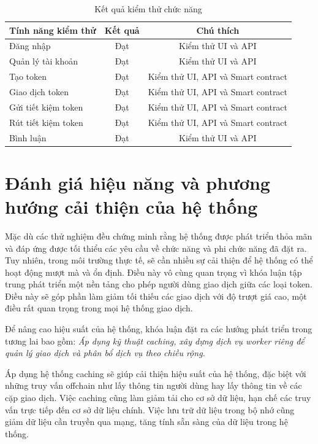 \begin{table}[htbp]
  \centering
  \begin{tabular}{|p{5cm}|c|c|}
    \hline
    \textbf{Tính năng kiểm thử} & \textbf{Kết quả} & \textbf{Chú thích}                 \\
    \hline
    Đăng nhập                   & Đạt              & Kiểm thử UI và API                 \\
    \hline
    Quản lý tài khoản           & Đạt              & Kiểm thử UI và API                 \\
    \hline
    Tạo token                   & Đạt              & Kiểm thử UI, API và Smart contract \\
    \hline
    Giao dịch token             & Đạt              & Kiểm thử UI, API và Smart contract \\
    \hline
    Gửi tiết kiệm token         & Đạt              & Kiểm thử UI, API và Smart contract \\
    \hline
    Rút tiết kiệm token         & Đạt              & Kiểm thử UI, API và Smart contract \\
    \hline
    Bình luận                   & Đạt              & Kiểm thử UI và API                 \\
    \hline
  \end{tabular}
  \caption{Kết quả kiểm thử chức năng}
  \label{tab:test-results}
\end{table}

\section{Đánh giá hiệu năng và phương hướng cải thiện của hệ thống}
Mặc dù các thử nghiệm đều chứng minh rằng hệ thống được phát triển thỏa mãn
và đáp ứng được tối thiểu các yêu cầu về chức năng và phi chức năng đã đặt ra.
Tuy nhiên, trong môi trường thực tế, sẽ cần nhiều sự cải thiện để hệ thống có
thể
hoạt động mượt mà và ổn định. Điều này vô cùng quan trọng vì khóa luận tập
trung phát triển một nền tảng cho phép người dùng giao dịch giữa các loại
token. Điều này sẽ góp phần làm giảm tối thiếu các giao dịch với độ trượt giá
cao, một điều rất quan trọng trong mọi hệ thống giao dịch.

Để nâng cao hiệu suất của hệ thống, khóa luận đặt ra các hướng
phát triển trong tương lai bao gồm: \textit{Áp dụng kỹ thuật caching, xây dựng
  dịch vụ worker riêng để quản lý giao dịch và phân bổ dịch vụ theo chiều rộng.}

Áp dụng hệ thống caching sẽ giúp cải thiện hiệu suất của hệ thống, đặc biệt với
những truy vấn offchain như lấy thông tin người dùng hay lấy thông tin về các
cặp giao dịch. Việc caching cũng làm giảm tải cho cơ sở dữ liệu, hạn chế các
truy vấn trực tiếp đến cơ sở dữ liệu chính. Việc lưu trữ dữ liệu trong bộ nhớ
cũng giảm dữ liệu cần truyền qua mạng, tăng tính sẵn sàng của dữ liệu trong hệ
thống.

